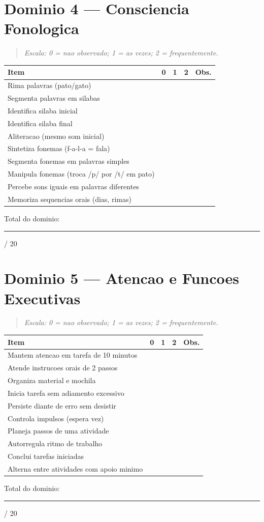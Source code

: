 \documentclass[a4paper,11pt]{book}
\begin{document}
\section{Dominio 4 --- Consciencia Fonologica}
\begin{quote}\itshape Escala: 0 = nao observado; 1 = as vezes; 2 = frequentemente.\end{quote}
\begin{tabular}{@{}p{10.5cm}ccc p{0.5cm}@{}}\toprule
Item & 0 & 1 & 2 & Obs. \\\midrule
Rima palavras (pato/gato) & & & & \\
Segmenta palavras em silabas & & & & \\
Identifica silaba inicial & & & & \\
Identifica silaba final & & & & \\
Aliteracao (mesmo som inicial) & & & & \\
Sintetiza fonemas (f-a-l-a = fala) & & & & \\
Segmenta fonemas em palavras simples & & & & \\
Manipula fonemas (troca /p/ por /t/ em pato) & & & & \\
Percebe sons iguais em palavras diferentes & & & & \\
Memoriza sequencias orais (dias, rimas) & & & & \\
\bottomrule\end{tabular}
\vspace{0.2cm}\noindent\small Total do dominio: \rule{1cm}{0.3pt} / 20\par\medskip


\section{Dominio 5 --- Atencao e Funcoes Executivas}
\begin{quote}\itshape Escala: 0 = nao observado; 1 = as vezes; 2 = frequentemente.\end{quote}
\begin{tabular}{@{}p{10.5cm}ccc p{0.5cm}@{}}\toprule
Item & 0 & 1 & 2 & Obs. \\\midrule
Mantem atencao em tarefa de 10 minutos & & & & \\
Atende instrucoes orais de 2 passos & & & & \\
Organiza material e mochila & & & & \\
Inicia tarefa sem adiamento excessivo & & & & \\
Persiste diante de erro sem desistir & & & & \\
Controla impulsos (espera vez) & & & & \\
Planeja passos de uma atividade & & & & \\
Autorregula ritmo de trabalho & & & & \\
Conclui tarefas iniciadas & & & & \\
Alterna entre atividades com apoio minimo & & & & \\
\bottomrule\end{tabular}
\vspace{0.2cm}\noindent\small Total do dominio: \rule{1cm}{0.3pt} / 20\par\medskip
\end{document}
